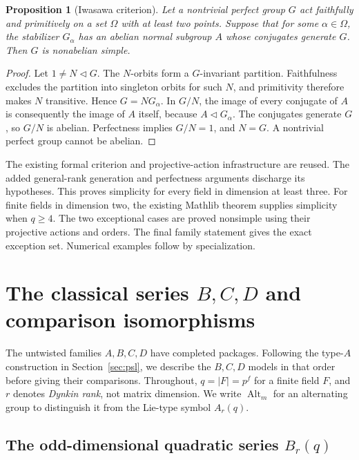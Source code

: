 \documentclass[11pt]{article}
\numberwithin{equation}{section}
\newtheorem{proposition}[theorem]{Proposition}
\theoremstyle{definition}
\newcommand{\Alt}{\operatorname{Alt}}
\begin{document}
\begin{proposition}[Iwasawa criterion]\label{prop:iwasawa}
Let a nontrivial perfect group $G$ act faithfully and primitively on a
set $\Omega$ with at least two points. Suppose that for some
$\alpha\in\Omega$, the stabilizer $G_\alpha$ has an abelian normal
subgroup $A$ whose conjugates generate $G$. Then $G$ is nonabelian simple.
\end{proposition}

\begin{proof}
Let $1\ne N\lhd G$. The $N$-orbits form a $G$-invariant partition.
Faithfulness excludes the partition into singleton orbits for such $N$,
and primitivity therefore makes $N$ transitive. Hence $G=NG_\alpha$.
In $G/N$, the image of every conjugate of $A$ is consequently the image
of $A$ itself, because $A\lhd G_\alpha$. The conjugates generate $G$,
so $G/N$ is abelian. Perfectness implies $G/N=1$, and $N=G$.
A nontrivial perfect group cannot be abelian.
\end{proof}

The existing formal criterion and projective-action infrastructure are
reused. The added general-rank generation and perfectness arguments
discharge its hypotheses. This proves simplicity for every field in
dimension at least three. For finite fields in dimension two, the
existing Mathlib theorem supplies simplicity when $q\geq4$.
The two exceptional cases are proved nonsimple using their projective
actions and orders. The final family statement gives the exact exception set. Numerical
examples follow by specialization.

\section{The classical series \texorpdfstring{$B,C,D$}{B, C, D} and comparison isomorphisms}\label{sec:classical}

The untwisted families $A,B,C,D$ have completed packages. Following
the type-$A$ construction in Section~\ref{sec:psl}, we describe the
$B,C,D$ models in that order before giving their comparisons.
Throughout, $q=|F|=p^f$ for a finite field $F$, and $r$ denotes
\emph{Dynkin rank}, not matrix dimension. We write $\Alt_m$ for an
alternating group to distinguish it from the Lie-type symbol $A_r(q)$.

\subsection{The odd-dimensional quadratic series \texorpdfstring{$B_r(q)$}{Br(q)}}\label{sec:type-b}
\end{document}
